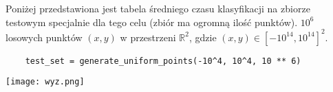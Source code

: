 \quad Poniżej przedstawiona jest tabela średniego czasu klasyfikacji na 
zbiorze testowym specjalnie dla tego celu (zbiór ma ogromną ilość punktów).
$10^6$ losowych punktów $(x, y)$ w przestrzeni $\mathbb{R}^2$, gdzie $(x, y) \in \left[-10^{14},10^{14}\right]^{2}$.
\begin{lstlisting}
    test_set = generate_uniform_points(-10^4, 10^4, 10 ** 6)
\end{lstlisting}

\texttt{[image: wyz.png]}
